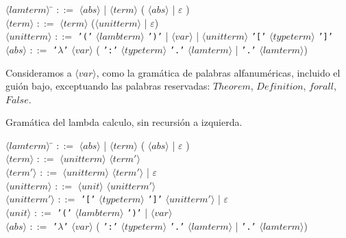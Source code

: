 \documentclass[a4paper,11pt]{article}
\begin{document}
\begin{tabbing}
$\langle lamterm \rangle$ \= $::=$ $\langle abs \rangle$ | $\langle term \rangle$ ( $\langle abs \rangle$ | $\varepsilon$ ) \\

$\langle term \rangle$ \> $::=$ $\langle term \rangle$ ($\langle unitterm \rangle$ | $\varepsilon$) \\

$\langle unitterm \rangle$ \> $::=$ \texttt{'('} $\langle lambterm \rangle$ \texttt{')'} |
$\langle var \rangle$ | $\langle unitterm \rangle$ \texttt{'['} $\langle typeterm \rangle$ \texttt{']'}\\

$\langle abs \rangle$ \> $::=$ \texttt{'$\lambda$'} $\langle var \rangle$ ( \texttt{':'} $\langle typeterm \rangle$ \texttt{'.'} $\langle lamterm \rangle$
| \texttt{'.'} $\langle lamterm \rangle$)
\end{tabbing}

Consideramos a $\langle var \rangle$, como la gramática de palabras alfanuméricas, incluido el guión bajo, exceptuando
las palabras reservadas: $Theorem$, $Definition$, $forall$, $False$.

Gramática del lambda calculo, sin recursión a izquierda.

\begin{tabbing}
$\langle lamterm \rangle$ \= $::=$ $\langle abs \rangle$ | $\langle term \rangle$ ( $\langle abs \rangle$ | $\varepsilon$ ) \\

$\langle term \rangle$ \> $::=$ $\langle unitterm \rangle$ $\langle term' \rangle$ \\

$\langle term' \rangle$ \> $::=$  $\langle unitterm \rangle$  $\langle term' \rangle$ | $\varepsilon$ \\

$\langle unitterm \rangle$ \> $::=$ $\langle unit \rangle$ $\langle unitterm' \rangle$ \\

$\langle unitterm' \rangle$ \> $::=$ \texttt{'['} $\langle typeterm \rangle$ \texttt{']'} $\langle unitterm' \rangle$ | $\varepsilon$ \\

$\langle unit \rangle$ \> $::=$ \texttt{'('} $\langle lambterm \rangle$ \texttt{')'} | $\langle var \rangle$ \\

$\langle abs \rangle$ \> $::=$ \texttt{'$\lambda$'} $\langle var \rangle$ ( \texttt{':'} $\langle typeterm \rangle$ \texttt{'.'} $\langle lamterm \rangle$
| \texttt{'.'} $\langle lamterm \rangle$)
\end{tabbing}
\end{document}
